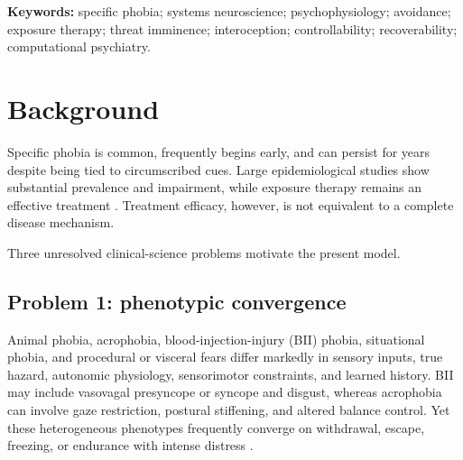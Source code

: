 \documentclass[11pt]{article}
\begin{document}
\begin{abstract}
\textbf{Predictions:} RRHM predicts that defensive transition will occur earlier when estimated eRRH contracts even when objective threat, physical threat imminence, uncertainty, perceived control, escape availability, and action number are matched. A shared eRRH parameter should predict transition timing across animal, natural-environment, blood-injection-injury, situational, and procedural/visceral phobias despite subtype-specific autonomic and sensorimotor outputs.

\textbf{Conclusions:} RRHM is an experiment-ready medical-science hypothesis rather than an established mechanism. Its clinical and scientific value depends on independent measurement, parameter identifiability, prospective prediction, and superior held-out performance over rival models.
\end{abstract}

\noindent\textbf{Keywords:} specific phobia; systems neuroscience; psychophysiology; avoidance; exposure therapy; threat imminence; interoception; controllability; recoverability; computational psychiatry.

\section{Background}
Specific phobia is common, frequently begins early, and can persist for years despite being tied to circumscribed cues. Large epidemiological studies show substantial prevalence and impairment, while exposure therapy remains an effective treatment \cite{wardenaar2017,odgers2022}. Treatment efficacy, however, is not equivalent to a complete disease mechanism.

Three unresolved clinical-science problems motivate the present model.

\subsection{Problem 1: phenotypic convergence}
Animal phobia, acrophobia, blood-injection-injury (BII) phobia, situational phobia, and procedural or visceral fears differ markedly in sensory inputs, true hazard, autonomic physiology, sensorimotor constraints, and learned history. BII may include vasovagal presyncope or syncope and disgust, whereas acrophobia can involve gaze restriction, postural stiffening, and altered balance control. Yet these heterogeneous phenotypes frequently converge on withdrawal, escape, freezing, or endurance with intense distress \cite{lipsitz2002,ducasse2013,huppert2020}.
\end{document}
